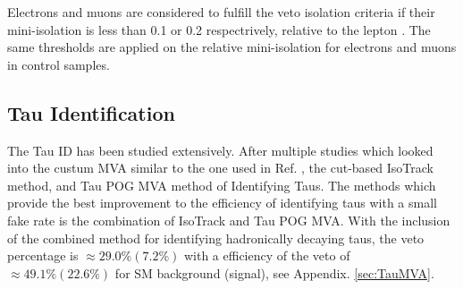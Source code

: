  
 Electrons and muons are considered to fulfill the veto isolation criteria if their mini-isolation is less than 0.1 or 0.2 respectrively, relative to the lepton \pt. The same thresholds are applied on the relative mini-isolation for electrons and muons in control samples. 
 
\subsection{Tau Identification}\label{TauID}
The Tau ID has been studied extensively. After multiple studies which looked into the custum MVA \cite{roe_boosted_2004, hoecker_tmva_2007} similar to the one used in Ref. \cite{noauthor_search_nodate}, the cut-based IsoTrack method, and Tau POG MVA method of Identifying Taus. The methods which provide the best improvement to the efficiency of identifying taus with a small fake rate is the combination of IsoTrack and Tau POG MVA. With the inclusion of the combined method for identifying hadronically decaying taus, the veto percentage is $\approx29.0\%(7.2\%)$ with a efficiency of the veto of $\approx49.1\%(22.6\%)$ for SM background (signal), see Appendix. \ref{sec:TauMVA}. 

